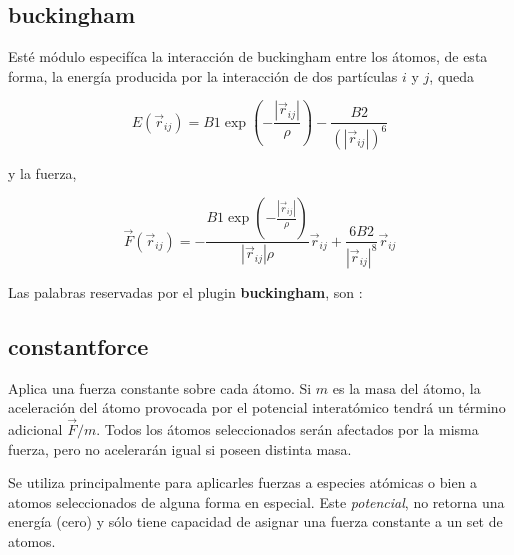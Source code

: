 \subsection{buckingham}

Est\'e m\'odulo especif\'ica la interacci\'on de buckingham entre los \'atomos,
de esta forma, la energ\'ia producida por la interacci\'on de dos part\'iculas
$i$ y $j$, queda

$$E(\vec{r}_{ij}) = B1 \exp\left(-\frac{|\vec{r}_{ij}|}{\rho}\right) -
\frac{B2}{(|\vec{r}_{ij}|)^6}$$

y la fuerza,

$$\vec{F}(\vec{r}_{ij}) =
-\frac{B1\exp\left(-\frac{|\vec{r}_{ij}|}{\rho}\right)}{|\vec{r}_{ij}|\rho}\vec{
r}_{ij} + \frac{6B2}{|\vec{r}_{ij}|^8}\vec{r}_{ij}$$

Las palabras reservadas por el plugin \textbf{buckingham}, son :


\subsection{constantforce}
Aplica una fuerza constante sobre cada \'atomo. Si $m$ es la masa del \'atomo,
la aceleraci\'on del \'atomo provocada por el potencial interat\'omico tendr\'a
un t\'ermino adicional $\vec F/m$. Todos los \'atomos seleccionados ser\'an
afectados por la misma fuerza, pero no acelerar\'an igual si poseen distinta
masa.

Se utiliza principalmente para aplicarles fuerzas a especies at\'omicas o bien a
atomos seleccionados de alguna forma en especial. Este \textit{potencial}, no
retorna una energ\'ia (cero) y s\'olo tiene capacidad de asignar una fuerza
constante a un set de atomos.\\
                                       
